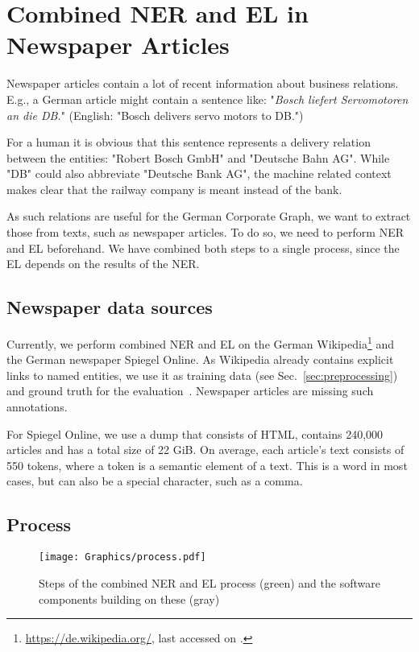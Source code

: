 \section{Combined NER and EL in Newspaper Articles}
\label{sec:ner_el}
Newspaper articles contain a lot of recent information about business relations. E.g., a German article might contain a sentence like: "\textit{Bosch liefert Servomotoren an die DB.}" (English: "Bosch delivers servo motors to DB.")

For a human it is obvious that this sentence represents a delivery relation between the entities: "Robert Bosch GmbH" and "Deutsche Bahn AG". While "DB" could also abbreviate "Deutsche Bank AG", the machine related context makes clear that the railway company is meant instead of the bank.

As such relations are useful for the German Corporate Graph, we want to extract those from texts, such as newspaper articles. To do so, we need to perform NER and EL beforehand. We have combined both steps to a single process, since the EL depends on the results of the NER.



\subsection{Newspaper data sources}
Currently, we perform combined NER and EL on the German Wikipedia\footnote{\url{https://de.wikipedia.org/}, last accessed on .} and the German newspaper Spiegel Online\footnotemark{}. As Wikipedia already contains explicit links to named entities, we use it as training data (see Sec.~\ref{sec:preprocessing}) and ground truth for the evaluation~\cite{ehmueller}. Newspaper articles are missing such annotations.

For Spiegel Online, we use a dump that consists of HTML, contains 240,000\footnotemark{} articles and has a total size of 22 GiB. On average, each article's text consists of 550 tokens, where a token is a semantic element of a text. This is a word in most cases, but can also be a special character, such as a comma.



\subsection{Process}
\begin{figure}[ht]
	\centering
  \texttt{[image: Graphics/process.pdf]}
	\caption{Steps of the combined NER and EL process (green) and the software components building on these (gray)}
	\label{fig:ner_el_process}
\end{figure}


